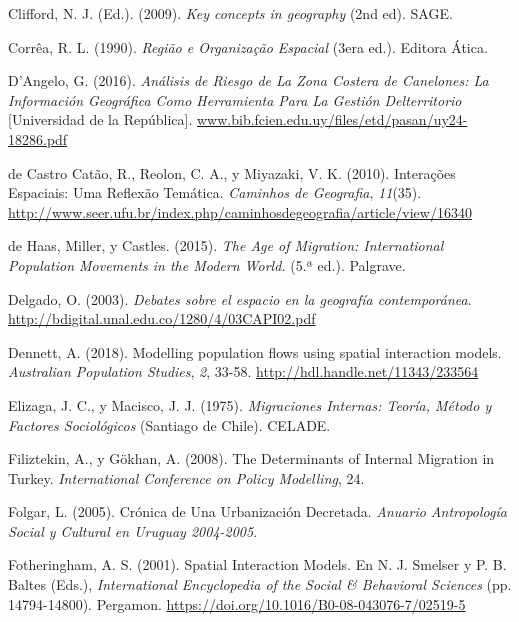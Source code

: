 \documentclass[12pt,spanish,]{article}
\begin{document}
\leavevmode\hypertarget{ref-clifford2009}{}%
Clifford, N. J. (Ed.). (2009). \emph{Key concepts in geography} (2nd
ed). SAGE.

\leavevmode\hypertarget{ref-correa1990}{}%
Corrêa, R. L. (1990). \emph{Região e Organização Espacial} (3era ed.).
Editora Ática.

\leavevmode\hypertarget{ref-dangelo2016}{}%
D'Angelo, G. (2016). \emph{Análisis de Riesgo de La Zona Costera de
Canelones: La Información Geográfica Como Herramienta Para La Gestión
Delterritorio} {[}Universidad de la República{]}.
\url{www.bib.fcien.edu.uy/files/etd/pasan/uy24-18286.pdf}

\leavevmode\hypertarget{ref-decastrocatao2010}{}%
de Castro Catão, R., Reolon, C. A., y Miyazaki, V. K. (2010). Interações
Espaciais: Uma Reflexão Temática. \emph{Caminhos de Geografia},
\emph{11}(35).
\url{http://www.seer.ufu.br/index.php/caminhosdegeografia/article/view/16340}

\leavevmode\hypertarget{ref-dehaas2015}{}%
de Haas, Miller, y Castles. (2015). \emph{The Age of Migration:
International Population Movements in the Modern World.} (5.ª ed.).
Palgrave.

\leavevmode\hypertarget{ref-delgado2003}{}%
Delgado, O. (2003). \emph{Debates sobre el espacio en la geografía
contemporánea}. \url{http://bdigital.unal.edu.co/1280/4/03CAPI02.pdf}

\leavevmode\hypertarget{ref-dennett2018}{}%
Dennett, A. (2018). Modelling population flows using spatial interaction
models. \emph{Australian Population Studies}, \emph{2}, 33-58.
\url{http://hdl.handle.net/11343/233564}

\leavevmode\hypertarget{ref-elizaga1975}{}%
Elizaga, J. C., y Macisco, J. J. (1975). \emph{Migraciones Internas:
Teoría, Método y Factores Sociológicos} (Santiago de Chile). CELADE.

\leavevmode\hypertarget{ref-filiztekin2008}{}%
Filiztekin, A., y Gökhan, A. (2008). The Determinants of Internal
Migration in Turkey. \emph{International Conference on Policy
Modelling}, 24.

\leavevmode\hypertarget{ref-folgar2005}{}%
Folgar, L. (2005). Crónica de Una Urbanización Decretada. \emph{Anuario
Antropología Social y Cultural en Uruguay 2004-2005}.

\leavevmode\hypertarget{ref-fotheringham2001}{}%
Fotheringham, A. S. (2001). Spatial Interaction Models. En N. J. Smelser
y P. B. Baltes (Eds.), \emph{International Encyclopedia of the Social \&
Behavioral Sciences} (pp. 14794-14800). Pergamon.
\url{https://doi.org/10.1016/B0-08-043076-7/02519-5}
\end{document}
